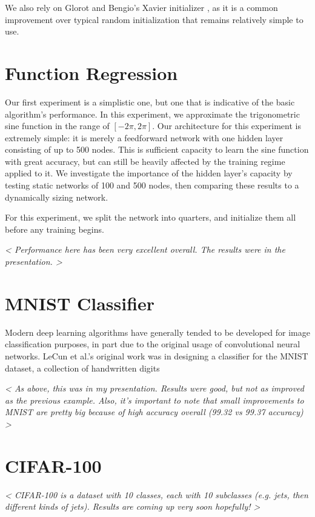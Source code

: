 We also rely on Glorot and Bengio's Xavier initializer \cite{glorot2010understanding}, as it is a common improvement over typical random initialization that remains relatively simple to use.


\section{Function Regression}
Our first experiment is a simplistic one, but one that is indicative of the basic algorithm's performance.
In this experiment, we approximate the trigonometric sine function in the range of $[-2\pi, 2\pi]$.
Our architecture for this experiment is extremely simple: it is merely a feedforward network with one hidden layer consisting of up to 500 nodes.
This is sufficient capacity to learn the sine function with great accuracy, but can still be heavily affected by the training regime applied to it.
We investigate the importance of the hidden layer's capacity by testing static networks of 100 and 500 nodes, then comparing these results to a dynamically sizing network.

For this experiment, we split the network into quarters, and initialize them all before any training begins.

\emph{ < Performance here has been very excellent overall. The results were in the presentation. > }




\section{MNIST Classifier}
Modern deep learning algorithms have generally tended to be developed for image classification purposes, in part due to the original usage of convolutional neural networks.
LeCun et al.'s original work was in designing a classifier for the MNIST dataset, a collection of handwritten digits 

\emph{ < As above, this was in my presentation. Results were good, but not as improved as the previous example. Also, it's important to note that small improvements to MNIST are pretty big because of high accuracy overall (99.32 vs 99.37 accuracy) > }


\section{CIFAR-100}
\emph{ < CIFAR-100 is a dataset with 10 classes, each with 10 subclasses (e.g. jets, then different kinds of jets). Results are coming up very soon hopefully! > }

